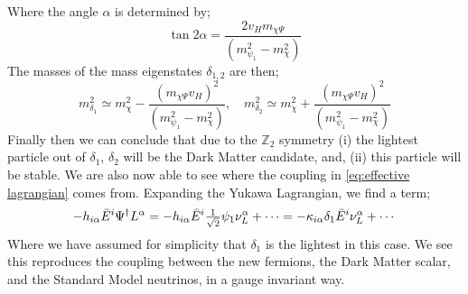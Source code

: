 \documentclass[10pt]{article}
\begin{document}
Where the angle $\alpha$ is determined by;
\begin{equation}
  \tan 2\alpha = \frac{2v_H m_{\chi\Psi}}{(m_{\psi_1}^2 - m_\chi^2)}
\end{equation}
The masses of the mass eigenstates $\delta_{1,2}$ are then;
\begin{equation}
  m_{\delta_1}^2 \simeq m_\chi^2 - \frac{(m_{\chi\Psi}v_H)^2}{(m_{\psi_1}^2 - m_\chi^2)}, \quad m_{\delta_2}^2 \simeq m_\chi^2 + \frac{(m_{\chi\Psi}v_H)^2}{(m_{\psi_1}^2 - m_\chi^2)}
\end{equation}
Finally then we can conclude that due to the $\mathbb{Z}_2$ symmetry (i) the lightest particle out of $\delta_1$, $\delta_2$ will be the Dark Matter candidate, and, (ii) this particle will be stable. We are also now able to see where the coupling in \eqref{eq:effective lagrangian} comes from. Expanding the Yukawa Lagrangian, we find a term;
\begin{equation}
  -h_{i\alpha}\bar{E}^i \Psi^{\dagger} L^\alpha = -h_{i\alpha}\bar{E}^i \tfrac{1}{\sqrt{2}}\psi_1\nu^\alpha_L + \cdots = -\kappa_{i\alpha} \delta_1 \bar{E}^i \nu^\alpha_L + \cdots
\end{equation}
Where we have assumed for simplicity that $\delta_1$ is the lightest in this case. We see this reproduces the coupling between the new fermions, the Dark Matter scalar, and the Standard Model neutrinos, in a gauge invariant way.
\end{document}
